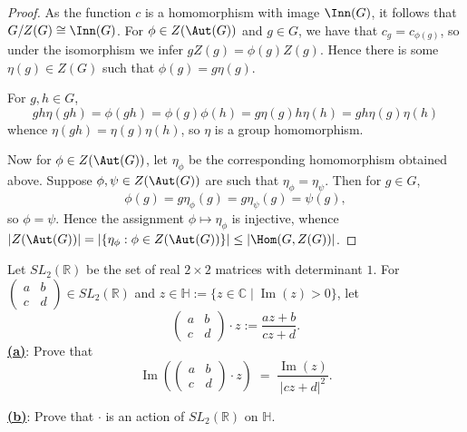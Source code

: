 \documentclass[12pt]{article}
\begin{document}
\begin{homeworkProblem}
\begin{proof}
As the function $ c $  is a homomorphism with image $ \Inn(G) $, it follows that $ G/Z(G) \cong \Inn(G) $. For $ \phi\in Z(\Aut(G)) $ and $ g\in G $, we have that $ c_{g} = c_{\phi(g)} $, so under the isomorphism we infer $ gZ(g) = \phi(g)Z(g) $. Hence there is some $ \eta(g)\in Z(G) $ such that $ \phi(g) = g \eta(g) $. 

For $ g,h\in G $,
\[
  gh \eta(gh) = \phi(gh) = \phi(g) \phi(h) = g\eta(g) h \eta(h) = gh\eta(g)\eta(h)
\]
whence $ \eta(gh) = \eta(g)\eta(h) $, so $ \eta $ is a group homomorphism.

Now for $ \phi\in Z(\Aut(G)) $, let $ \eta_{\phi} $ be the corresponding homomorphism obtained above. Suppose $ \phi,\psi\in Z(\Aut(G)) $ are such that $ \eta_{\phi} = \eta_{\psi} $. Then for $ g\in G $,
\[
  \phi(g) = g \eta_{\phi}(g) = g \eta_{\psi}(g) = \psi(g),
\]
so $ \phi=\psi $. Hence the assignment $ \phi\mapsto \eta_{\phi} $ is injective, whence $ |Z(\Aut(G))|=|\{\eta_{\phi}: \phi\in Z(\Aut(G))\}|\leq |\Hom(G,Z(G))| $.
\end{proof}

\end{homeworkProblem}


\begin{homeworkProblem}
Let $SL_2(\mathbb{R})$ be the set of real $2\times 2$ matrices with determinant $1$. For
$\begin{pmatrix} a & b \\ c & d \end{pmatrix} \in SL_2(\mathbb{R})$ and $z \in \mathbb{H} := \{ z \in \mathbb{C} \mid \operatorname{Im}(z) > 0\}$, let
\[
  \begin{pmatrix} a & b \\ c & d \end{pmatrix} \cdot z := \frac{az + b}{cz + d}.
\]
\underline{\textbf{(a)}}: Prove that
  \[
    \operatorname{Im}\!\left( \begin{pmatrix} a & b \\ c & d \end{pmatrix} \cdot z \right)
    \;=\; \frac{\operatorname{Im}(z)}{\lvert cz + d\rvert^{2}}.
  \]


\underline{\textbf{(b)}}: Prove that $\cdot$ is an action of $SL_2(\mathbb{R})$ on $\mathbb{H}$.


\end{homeworkProblem}
\end{document}
